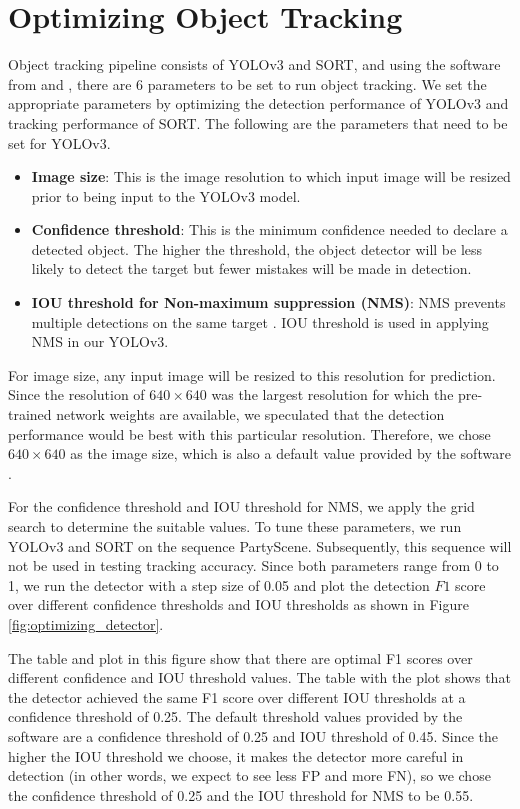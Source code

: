 \section{Optimizing Object Tracking}
\label{sec:methods/section_b}

Object tracking pipeline consists of YOLOv3 and SORT, and using the software from \cite{jocher_ultralyticsyolov3_2021} and \cite{abewley_abewleysort_2021}, there are 6 parameters to be set to run object tracking. We set the appropriate parameters by optimizing the detection performance of YOLOv3 and tracking performance of SORT. The following are the parameters that need to be set for YOLOv3.
\begin{itemize}
    \item \textbf{Image size}: This is the image resolution to which input image will be resized prior to being input to the YOLOv3 model.
    \item \textbf{Confidence threshold}: This is the minimum confidence needed to declare a detected object. The higher the threshold, the object detector will be less likely to detect the target but fewer mistakes will be made in detection.
    \item \textbf{IOU threshold for Non-maximum suppression (NMS)}: NMS prevents multiple detections on the same target \cite{redmon_you_2016}. IOU threshold is used in applying NMS in our YOLOv3.
\end{itemize}
For image size, any input image will be resized to this resolution for prediction. Since the resolution of $640\times640$ was the largest resolution for which the pre-trained network weights are available, we speculated that the detection performance would be best with this particular resolution. Therefore, we chose $640\times 640$ as the image size, which is also a default value provided by the software \cite{jocher_ultralyticsyolov3_2021}.

For the confidence threshold and IOU threshold for NMS, we apply the grid search to determine the suitable values. To tune these parameters, we run YOLOv3 and SORT on the sequence PartyScene. Subsequently, this sequence will not be used in testing tracking accuracy. Since both parameters range from 0 to 1, we run the detector with a step size of 0.05 and plot the detection $F1$ score over different confidence thresholds and IOU thresholds as shown in Figure \ref{fig:optimizing_detector}.

The table and plot in this figure show that there are optimal F1 scores over different confidence and IOU threshold values. The table with the plot shows that the detector achieved the same F1 score over different IOU thresholds at a confidence threshold of 0.25. The default threshold values provided by the software \cite{jocher_ultralyticsyolov3_2021} are a confidence threshold of 0.25 and IOU threshold of 0.45. Since the higher the IOU threshold we choose, it makes the detector more careful in detection (in other words, we expect to see less FP and more FN), so we chose the confidence threshold of 0.25 and the IOU threshold for NMS to be 0.55.

